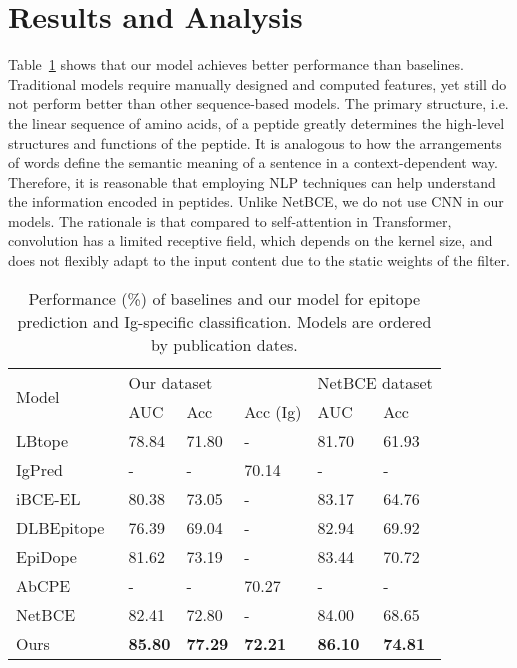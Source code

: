 \documentclass[runningheads]{llncs}
\begin{document}
\section{Results and Analysis}
Table~\ref{tab1} shows that our model achieves better performance than baselines. Traditional models require manually designed and computed features, yet still do not perform better than other sequence-based models. The primary structure, i.e. the linear sequence of amino acids, of a peptide greatly determines the high-level structures and functions of the peptide. It is analogous to how the arrangements of words define the semantic meaning of a sentence in a context-dependent way. Therefore, it is reasonable that employing NLP techniques can help understand the information encoded in peptides.
Unlike NetBCE, we do not use CNN in our models. The rationale is that compared to self-attention in Transformer, convolution has a limited receptive field, which depends on the kernel size, and does not flexibly adapt to the input content due to the static weights of the filter.
\begin{table}[htbp]
\caption{Performance (\%) of baselines and our model for epitope prediction and Ig-specific classification. Models are ordered by publication dates.}
\begin{center}
\begin{tabular}{l|l|l|l|l|l}
\hline
\multirow[t]{2}{*}{Model} & \multicolumn{3}{l|}{Our dataset} & \multicolumn{2}{l}{NetBCE dataset} \\
\cline{2-6}
 & AUC & Acc & Acc (Ig) & AUC & Acc \\
\hline
LBtope~\cite{singh2013improved} & 78.84 & 71.80 & - & 81.70 & 61.93 \\
IgPred~\cite{gupta2013identification} & - & - & 70.14 & - & - \\
iBCE-EL~\cite{manavalan2018ibce} & 80.38 & 73.05 & - & 83.17 & 64.76 \\
DLBEpitope~\cite{liu2020deep} & 76.39 & 69.04 & - & 82.94 & 69.92 \\
EpiDope~\cite{collatz2021epidope} & 81.62 & 73.19 & - & 83.44 & 70.72 \\
AbCPE~\cite{kadam2021antibody} & - & - & 70.27 & - & - \\
NetBCE~\cite{xu2022netbce} & 82.41 & 72.80 & - & 84.00 & 68.65 \\
Ours & \textbf{85.80} & \textbf{77.29} & \textbf{72.21} & \textbf{86.10} & \textbf{74.81} \\
\hline
\end{tabular}
\label{tab1}
\end{center}
\end{table}
\end{document}
